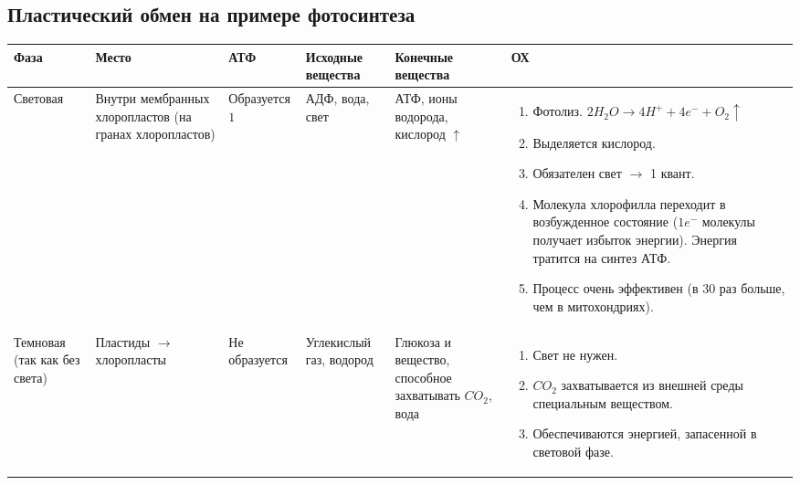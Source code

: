 \documentclass[12pt]{article}
\begin{document}
	\subsection{Пластический обмен на примере фотосинтеза}
	\begin{xltabular}{\textwidth}{|m{2cm}|m{2cm}|m{2cm}|m{2.2cm}|m{2cm}|X|}
		\hline
		Фаза & Место & АТФ & Исходные вещества & Конечные вещества & ОХ\\
		\hline
		Световая & Внутри мембранных хлоропластов (на гранах хлоропластов) & Образуется $1$ & АДФ, вода, свет & АТФ, ионы водорода, кислород $\uparrow$ &
		\begin{enumerate}[1)]
			\item Фотолиз. $2H_2O \rightarrow 4H^+ + 4e^- + O_2 \uparrow$
			\item Выделяется кислород.
			\item Обязателен свет $\rightarrow$ 1 квант.
			\item Молекула хлорофилла переходит в возбужденное состояние ($1 e^-$ молекулы получает избыток энергии). Энергия тратится на синтез АТФ.
			\item Процесс очень эффективен (в 30 раз больше, чем в митохондриях).
		\end{enumerate}\\
		\hline
		Темновая (так как без света) & Пластиды $\rightarrow$ хлоропласты & Не образуется & Углекислый газ, водород & Глюкоза и вещество, способное захватывать $CO_2$, вода &
		\begin{enumerate}[1)]
			\item Свет не нужен.
			\item $CO_2$ захватывается из внешней среды специальным веществом.
			\item Обеспечиваются энергией, запасенной в световой фазе.
		\end{enumerate}
		\\
		\hline
	\end{xltabular}
\end{document}
